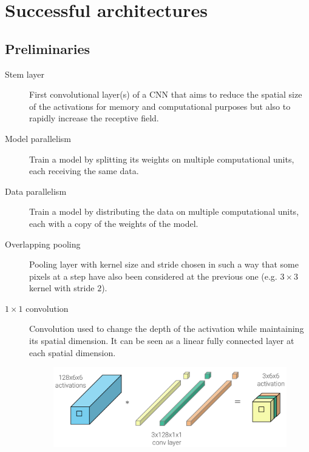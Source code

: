 \chapter{Successful architectures}


\section{Preliminaries}

\begin{description}
    \item[Stem layer] 
        First convolutional layer(s) of a CNN that aims to reduce the spatial size of the activations for memory and computational purposes
        but also to rapidly increase the receptive field.

    \item[Model parallelism] 
        Train a model by splitting its weights on multiple computational units, each receiving the same data.

    \item[Data parallelism] 
        Train a model by distributing the data on multiple computational units, each with a copy of the weights of the model.

    \item[Overlapping pooling] 
        Pooling layer with kernel size and stride chosen in such a way that
        some pixels at a step have also been considered at the previous one (e.g. $3 \times 3$ kernel with stride $2$).

    \item[$1 \times 1$ convolution] 
        Convolution used to change the depth of the activation while maintaining its spatial dimension.
        It can be seen as a linear fully connected layer at each spatial dimension.

        \begin{figure}[H]
            \centering
            \includegraphics[width=0.55\linewidth]{./img/_1conv.pdf}
        \end{figure}


\end{description}
